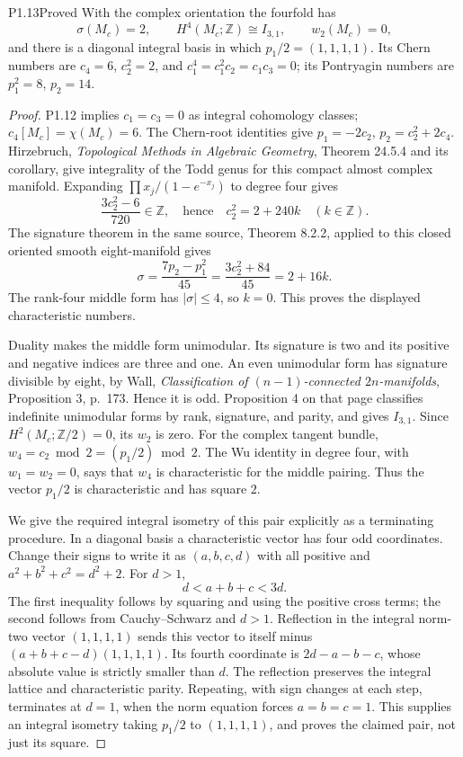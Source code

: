 \begin{statement}{P1.13}{Proved}
With the complex orientation the fourfold has
\[
\sigma(M_c)=2,\qquad H^4(M_c;\mathbb Z)\cong I_{3,1},\qquad
w_2(M_c)=0,
\]
and there is a diagonal integral basis in which
$p_1/2=(1,1,1,1)$.
Its Chern numbers are
$c_4=6$, $c_2^2=2$, and
$c_1^4=c_1^2c_2=c_1c_3=0$; its Pontryagin numbers are
$p_1^2=8$, $p_2=14$.
\end{statement}
\begin{proof}
P1.12 implies $c_1=c_3=0$ as integral cohomology classes;
$c_4[M_c]=\chi(M_c)=6$.  The Chern-root identities give
$p_1=-2c_2$, $p_2=c_2^2+2c_4$.
Hirzebruch, \emph{Topological Methods in Algebraic Geometry},
Theorem 24.5.4 and its corollary, give integrality of the Todd genus
for this compact almost complex manifold.  Expanding
$\prod x_j/(1-e^{-x_j})$ to degree four gives
\[
\frac{3c_2^2-6}{720}\in\mathbb Z,
\quad\text{hence}\quad c_2^2=2+240k\quad(k\in\mathbb Z).
\]
The signature theorem in the same source, Theorem 8.2.2, applied to
this closed oriented smooth eight-manifold gives
\[
\sigma=\frac{7p_2-p_1^2}{45}
      =\frac{3c_2^2+84}{45}=2+16k.
\]
The rank-four middle form has $|\sigma|\leq4$, so $k=0$.
This proves the displayed characteristic numbers.

Duality makes the middle form unimodular.  Its signature is two and
its positive and negative indices are three and one.  An even
unimodular form has signature divisible by eight, by Wall,
\emph{Classification of $(n-1)$-connected $2n$-manifolds},
Proposition 3, p.~173.  Hence it is odd.  Proposition 4 on that page
classifies indefinite unimodular forms by rank, signature, and
parity, and gives $I_{3,1}$.
Since $H^2(M_c;\mathbb Z/2)=0$, its $w_2$ is zero.
For the complex tangent bundle,
$w_4=c_2\bmod2=(p_1/2)\bmod2$.
The Wu identity in degree four, with $w_1=w_2=0$, says that $w_4$ is
characteristic for the middle pairing.  Thus the vector $p_1/2$ is
characteristic and has square $2$.

We give the required integral isometry of this pair explicitly as
a terminating procedure.  In a diagonal basis a characteristic vector
has four odd coordinates.  Change their signs to write it as
$(a,b,c,d)$ with all positive and
$a^2+b^2+c^2=d^2+2$.
For $d>1$,
\[
d<a+b+c<3d.
\]
The first inequality follows by squaring and using the positive cross
terms; the second follows from Cauchy--Schwarz and $d>1$.
Reflection in the integral norm-two vector $(1,1,1,1)$ sends this
vector to itself minus $(a+b+c-d)(1,1,1,1)$.
Its fourth coordinate is $2d-a-b-c$, whose absolute value is strictly
smaller than $d$.  The reflection preserves the integral lattice and
characteristic parity.  Repeating, with sign changes at each step,
terminates at $d=1$, when the norm equation forces $a=b=c=1$.
This supplies an integral isometry taking $p_1/2$ to $(1,1,1,1)$,
and proves the claimed pair, not just its square.
\end{proof}

